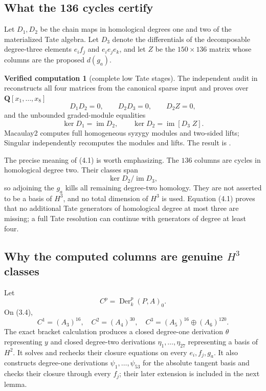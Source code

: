 \documentclass[11pt]{article}
\theoremstyle{definition}
\newtheorem{computation}[theorem]{Verified computation}
\theoremstyle{remark}
\newcommand{\QQ}{\mathbf Q}
\newcommand{\Der}{\operatorname{Der}}
\newcommand{\im}{\operatorname{im}}
\begin{document}
\subsection{What the 136 cycles certify}

Let $D_1,D_2$ be the chain maps in homological degrees one and two of the
materialized Tate algebra.  Let $D_3$ denote the differentials of the
decomposable degree-three elements $e_if_j$ and $e_ie_je_k$, and let $Z$ be
the $150\times136$ matrix whose columns are the proposed $d(g_a)$.

\begin{computation}[complete low Tate stages]\label{comp:tate}
The independent audit in  reconstructs all four
matrices from the canonical sparse input and proves over $\QQ[x_1,\ldots,x_8]$
\[
 D_1D_2=0,\qquad D_2D_3=0,\qquad D_2Z=0,
\]
and the unbounded graded-module equalities
\[
 \ker D_1=\im D_2,
 \qquad
 \ker D_2=\im[D_3\;Z].                                      \tag{4.1}
\]
Macaulay2 computes full homogeneous syzygy modules and two-sided lifts;
Singular independently recomputes the modules and lifts.  The result is
.
\end{computation}

The precise meaning of (4.1) is worth emphasizing.  The $136$ columns are
cycles in homological degree two.  Their classes span
\[
 \ker D_2/\im D_3,                                           \tag{4.2}
\]
so adjoining the $g_a$ kills all remaining degree-two homology.  They are not
asserted to be a basis of $H^3$, and no total dimension of $H^3$ is used.
Equation (4.1) proves that no additional Tate generators of homological
degree at most three are missing; a full Tate resolution can continue with
generators of degree at least four.

\subsection{Why the computed columns are genuine
\texorpdfstring{$H^3$}{H3} classes}

Let
\[
 C^p=\Der_k^p(P,A)_0.
\]
On (3.4),
\[
 C^1=(A_3)^{16},\quad C^2=(A_4)^{30},\quad
 C^3=(A_5)^{16}\oplus(A_6)^{120}.                            \tag{4.3}
\]
The exact bracket calculation produces a closed degree-one derivation
$\theta$ representing $y$ and closed degree-two derivations
$\eta_1,\ldots,\eta_{27}$ representing a basis of $H^2$.  It solves and
rechecks their closure equations on every $e_i,f_j,g_a$.
It also constructs degree-one derivations
$\psi_1,\ldots,\psi_{53}$ for the absolute tangent basis and checks their
closure through every $f_j$; their later extension is included in the next
lemma.
\end{document}

